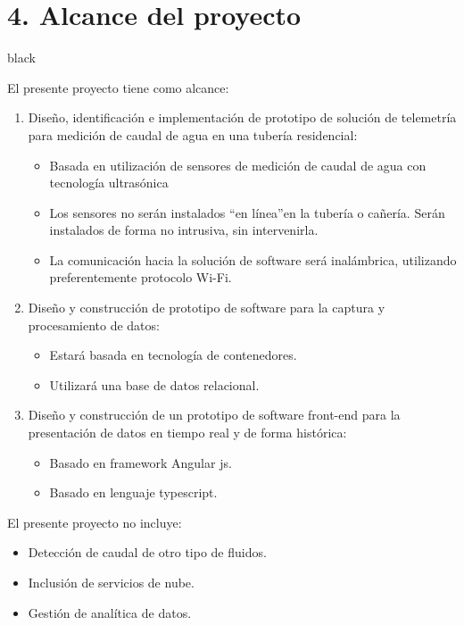 \documentclass[
11pt, %
codirector, %
]{charter}
\begin{document}
\section{4. Alcance del proyecto}
\label{sec:alcance}

\begin{consigna}{black}

El presente proyecto tiene como alcance:

\begin{enumerate}
\item Diseño, identificación e implementación de prototipo de solución de telemetría para medición de caudal de agua en una tubería residencial:
\begin{itemize}
	\item Basada en utilización de sensores de medición de caudal de agua con tecnología ultrasónica
	\item Los sensores no serán instalados \textquotedblleft{en línea}\textquotedblright  en la tubería o cañería. Serán instalados de forma no intrusiva, sin intervenirla.
	\item La comunicación hacia la solución de software será inalámbrica, utilizando preferentemente protocolo Wi-Fi.
\end{itemize}

\item Diseño y construcción de prototipo de software para la captura y procesamiento de datos:
\begin{itemize}
	\item Estará basada en tecnología de contenedores.
	\item Utilizará una base de datos relacional.
\end{itemize}

\item Diseño y construcción de un prototipo de software front-end para la presentación de datos en tiempo real y de forma histórica:
\begin{itemize}
	\item Basado en framework Angular js.
	\item Basado en lenguaje typescript.
\end{itemize}

\end{enumerate}

El presente proyecto no incluye:

\begin{itemize}
	\item Detección de caudal de otro tipo de fluidos.
	\item Inclusión de servicios de nube.
	\item Gestión de analítica de datos.
\end{itemize}


\end{consigna}
\end{document}
